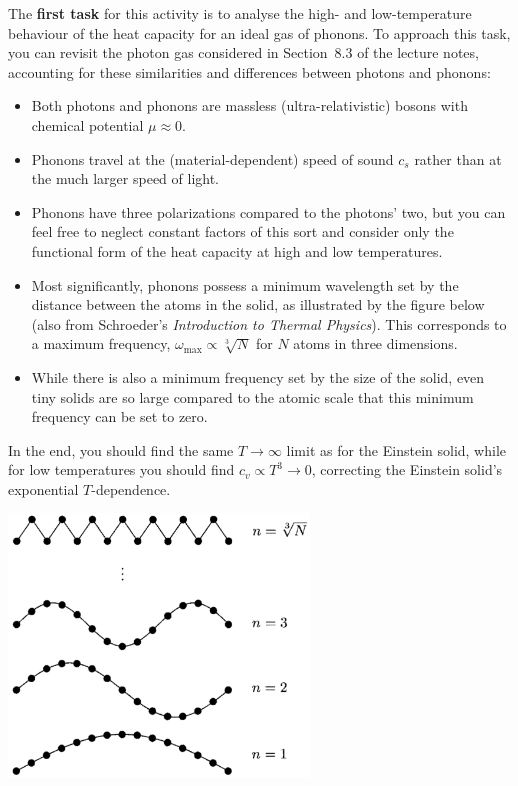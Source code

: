 \documentclass[12 pt]{article} %
\newcommand{\om}{\ensuremath{\omega} }
\begin{document}
The \textbf{first task} for this activity is to analyse the high- and low-temperature behaviour of the heat capacity for an ideal gas of phonons.
To approach this task, you can revisit the photon gas considered in Section~8.3 of the lecture notes, accounting for these similarities and differences between photons and phonons: \\[-24 pt]
\begin{itemize}
  \item Both photons and phonons are massless (ultra-relativistic) bosons with chemical potential $\mu \approx 0$.
  \item Phonons travel at the (material-dependent) speed of sound $c_s$ rather than at the much larger speed of light.
  \item Phonons have three polarizations compared to the photons' two, but you can feel free to neglect constant factors of this sort and consider only the functional form of the heat capacity at high and low temperatures.
  \item Most significantly, phonons possess a minimum wavelength set by the distance between the atoms in the solid, as illustrated by the figure below (also from Schroeder's \textit{Introduction to Thermal Physics}).
        This corresponds to a maximum frequency, $\om_{\text{max}} \propto \sqrt[3]{N}$ for $N$ atoms in three dimensions.
  \item While there is also a minimum frequency set by the size of the solid, even tiny solids are so large compared to the atomic scale that this minimum frequency can be set to zero.
\end{itemize}
In the end, you should find the same $T \to \infty$ limit as for the Einstein solid, while for low temperatures you should find $c_v \propto T^3 \to 0$, correcting the Einstein solid's exponential $T$-dependence.

\begin{center}\includegraphics[width=0.6\textwidth]{figs/phonons.pdf}\end{center}
\end{document}
